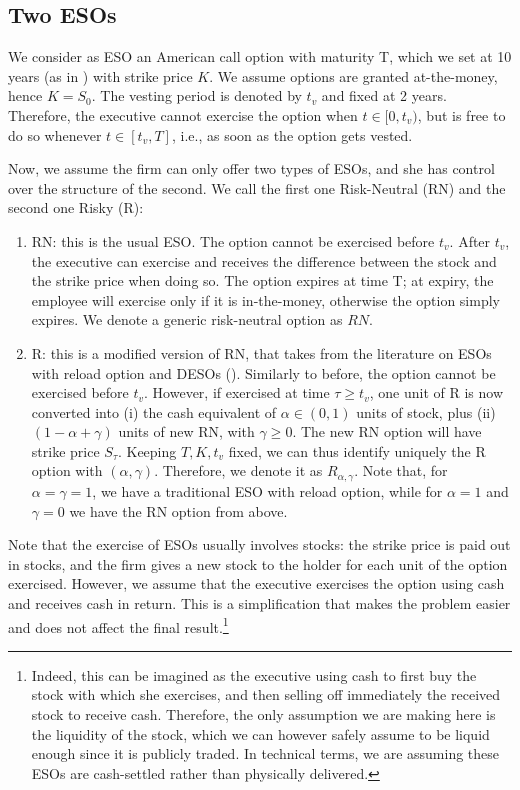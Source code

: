 \subsection{Two ESOs}
We consider as ESO an American call option with maturity T, which we set at 10 years (as in \cite{marquardt2002cost}) with strike price $K$. We assume options are granted at-the-money, hence $K=S_0$. The vesting period is denoted by $t_v$ and fixed at 2 years. %
Therefore, the executive cannot exercise the option when $t \in [0, t_v)$, but is free to do so whenever $t \in [t_v, T]$, i.e., as soon as the option gets vested. 

Now, we assume the firm can only offer two types of ESOs, and she has control over the structure of the second. We call the first one Risk-Neutral (RN) and the second one Risky (R):
\begin{enumerate}
    \item RN: this is the usual ESO. The option cannot be exercised before $t_v$. After $t_v$, the executive can exercise and receives the difference between the stock and the strike price when doing so. The option expires at time T; at expiry, the employee will exercise only if it is in-the-money, otherwise the option simply expires. We denote a generic risk-neutral option as $RN$.
    \item R: this is a modified version of RN, that takes from the literature on ESOs with reload option and DESOs (\cite{huang2013dynamic}).
    Similarly to before, the option cannot be exercised before $t_v$. However, if exercised at time $\tau \ge t_v$, one unit of R is now converted into (i) the cash equivalent of $\alpha \in (0,1)$ units of stock, plus (ii) $(1 - \alpha + \gamma)$ units of new RN, with $\gamma \ge 0$. The new RN option will have strike price $S_\tau$. Keeping $T, K, t_v$ fixed, we can thus identify uniquely the R option with $(\alpha, \gamma)$. Therefore, we denote it as $R_{\alpha, \gamma}$. Note that, for $\alpha = \gamma = 1$, we have a traditional ESO with reload option, while for $\alpha = 1$ and $\gamma = 0$ we have the RN option from above.
\end{enumerate}
Note that the exercise of ESOs usually involves stocks: the strike price is paid out in stocks, and the firm gives a new stock to the holder for each unit of the option exercised. 
However, we assume that the executive exercises the option using cash and receives cash in return. This is a simplification that makes the problem easier and does not affect the final result.\footnote{Indeed, this can be imagined as the executive using cash to first buy the stock with which she exercises, and then selling off immediately the received stock to receive cash. Therefore, the only assumption we are making here is the liquidity of the stock, which we can however safely assume to be liquid enough since it is publicly traded. In technical terms, we are assuming these ESOs are cash-settled rather than physically delivered.}

